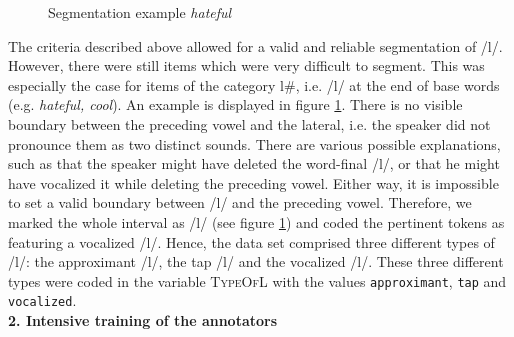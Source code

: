 \begin{figure} [b!]
	\centering
	\caption{Segmentation example \textit{hateful}}
	\label{fig:segmentation hateful}
\end{figure}

The criteria described above allowed for a valid and reliable segmentation of /l/. However, there were still items which were very difficult to segment. This was especially the case for items of the category l\#, i.e. /l/ at the end of base words (e.g. \textit{hateful, cool}). An example is displayed in figure \ref{fig:segmentation hateful}. There is no visible boundary between the preceding vowel and the lateral, i.e. the speaker did not pronounce them as two distinct sounds. There are various possible explanations, such as that the speaker might have deleted the word-final /l/, or that he might have vocalized it  while deleting the preceding vowel. Either way,  it is impossible to set a valid boundary between /l/ and the preceding vowel. Therefore, we marked the whole interval as /l/ (see figure \ref{fig:segmentation hateful}) and coded the pertinent tokens as featuring a vocalized /l/. Hence, the data set comprised three different types of /l/: the approximant /l/, the tap /l/ and the vocalized /l/. These three different types were coded in the variable \textsc{TypeOfL} with the values \texttt{approximant}, \texttt{tap} and \texttt{vocalized}.\\



\textbf{ 2.  Intensive training of the annotators}\\


